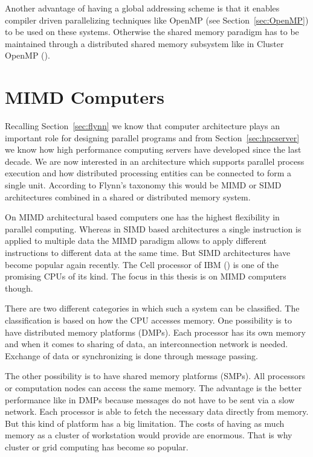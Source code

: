 Another advantage of having a global addressing scheme is that it
enables compiler driven parallelizing techniques like OpenMP (see
Section~\ref{sec:OpenMP}) to be used on these systems. Otherwise the
shared memory paradigm has to be maintained through a distributed
shared memory subsystem like in Cluster OpenMP
(\cite{hoeflinger06clusterOpenMP}).

\section{MIMD Computers}
\label{sec:mimd_computers}

Recalling Section~\ref{sec:flynn} we know that computer architecture
plays an important role for designing parallel programs and from  
Section~\ref{sec:hpcserver} we know how high performance computing
servers have developed since the last decade. We are now
interested in an architecture which supports parallel process execution
and how distributed processing entities can be connected to
form a single unit. According to Flynn's taxonomy this would be MIMD
or SIMD architectures combined in a shared or distributed memory system.


On MIMD architectural based computers one has the highest flexibility
in parallel computing. Whereas in SIMD based architectures a single
instruction is applied to multiple data the MIMD paradigm allows to
apply different instructions to different data at the same time. But
SIMD architectures have become popular again recently. The Cell
processor of IBM (\cite{kahle05cell}) is one of the promising CPUs of
its kind. The focus in 
this thesis is on MIMD computers though.


There are two different categories in which such a system can be
classified. The classification is based on how the CPU accesses
memory. One possibility is to have distributed memory platforms (DMPs). Each
processor has its own memory and when it comes to sharing of data, an
interconnection network is needed. Exchange of data or synchronizing
is done through message passing.

The other possibility is to have shared memory platforms (SMPs). All
processors or computation nodes can access the same memory. The
advantage is the better performance like in DMPs because messages do not
have to be sent via a slow network. Each processor is able to
fetch the necessary data directly from memory. But this kind of platform
has a big limitation. The costs of having as much memory as a cluster
of workstation would provide are enormous. That is why cluster or
grid computing has become so popular.

